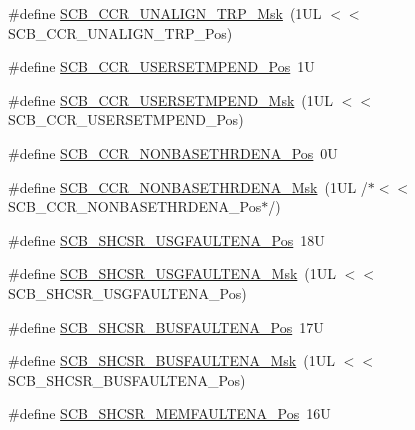 \begin{DoxyCompactItemize}
\item 
\#define \mbox{\hyperlink{group___c_m_s_i_s___s_c_b_ga68c96ad594af70c007923979085c99e0}{S\+C\+B\+\_\+\+C\+C\+R\+\_\+\+U\+N\+A\+L\+I\+G\+N\+\_\+\+T\+R\+P\+\_\+\+Msk}}~(1\+U\+L $<$$<$ S\+C\+B\+\_\+\+C\+C\+R\+\_\+\+U\+N\+A\+L\+I\+G\+N\+\_\+\+T\+R\+P\+\_\+\+Pos)
\item 
\#define \mbox{\hyperlink{group___c_m_s_i_s___s_c_b_ga789e41f45f59a8cd455fd59fa7652e5e}{S\+C\+B\+\_\+\+C\+C\+R\+\_\+\+U\+S\+E\+R\+S\+E\+T\+M\+P\+E\+N\+D\+\_\+\+Pos}}~1U
\item 
\#define \mbox{\hyperlink{group___c_m_s_i_s___s_c_b_ga4cf59b6343ca962c80e1885710da90aa}{S\+C\+B\+\_\+\+C\+C\+R\+\_\+\+U\+S\+E\+R\+S\+E\+T\+M\+P\+E\+N\+D\+\_\+\+Msk}}~(1\+U\+L $<$$<$ S\+C\+B\+\_\+\+C\+C\+R\+\_\+\+U\+S\+E\+R\+S\+E\+T\+M\+P\+E\+N\+D\+\_\+\+Pos)
\item 
\#define \mbox{\hyperlink{group___c_m_s_i_s___s_c_b_gab4615f7deb07386350365b10240a3c83}{S\+C\+B\+\_\+\+C\+C\+R\+\_\+\+N\+O\+N\+B\+A\+S\+E\+T\+H\+R\+D\+E\+N\+A\+\_\+\+Pos}}~0U
\item 
\#define \mbox{\hyperlink{group___c_m_s_i_s___s_c_b_gafe0f6be81b35d72d0736a0a1e3b4fbb3}{S\+C\+B\+\_\+\+C\+C\+R\+\_\+\+N\+O\+N\+B\+A\+S\+E\+T\+H\+R\+D\+E\+N\+A\+\_\+\+Msk}}~(1\+U\+L /$\ast$$<$$<$ S\+C\+B\+\_\+\+C\+C\+R\+\_\+\+N\+O\+N\+B\+A\+S\+E\+T\+H\+R\+D\+E\+N\+A\+\_\+\+Pos$\ast$/)
\item 
\#define \mbox{\hyperlink{group___c_m_s_i_s___s_c_b_gae71949507636fda388ec11d5c2d30b52}{S\+C\+B\+\_\+\+S\+H\+C\+S\+R\+\_\+\+U\+S\+G\+F\+A\+U\+L\+T\+E\+N\+A\+\_\+\+Pos}}~18U
\item 
\#define \mbox{\hyperlink{group___c_m_s_i_s___s_c_b_ga056fb6be590857bbc029bed48b21dd79}{S\+C\+B\+\_\+\+S\+H\+C\+S\+R\+\_\+\+U\+S\+G\+F\+A\+U\+L\+T\+E\+N\+A\+\_\+\+Msk}}~(1\+U\+L $<$$<$ S\+C\+B\+\_\+\+S\+H\+C\+S\+R\+\_\+\+U\+S\+G\+F\+A\+U\+L\+T\+E\+N\+A\+\_\+\+Pos)
\item 
\#define \mbox{\hyperlink{group___c_m_s_i_s___s_c_b_ga3d32edbe4a5c0335f808cfc19ec7e844}{S\+C\+B\+\_\+\+S\+H\+C\+S\+R\+\_\+\+B\+U\+S\+F\+A\+U\+L\+T\+E\+N\+A\+\_\+\+Pos}}~17U
\item 
\#define \mbox{\hyperlink{group___c_m_s_i_s___s_c_b_ga43e8cbe619c9980e0d1aacc85d9b9e47}{S\+C\+B\+\_\+\+S\+H\+C\+S\+R\+\_\+\+B\+U\+S\+F\+A\+U\+L\+T\+E\+N\+A\+\_\+\+Msk}}~(1\+U\+L $<$$<$ S\+C\+B\+\_\+\+S\+H\+C\+S\+R\+\_\+\+B\+U\+S\+F\+A\+U\+L\+T\+E\+N\+A\+\_\+\+Pos)
\item 
\#define \mbox{\hyperlink{group___c_m_s_i_s___s_c_b_ga685b4564a8760b4506f14ec4307b7251}{S\+C\+B\+\_\+\+S\+H\+C\+S\+R\+\_\+\+M\+E\+M\+F\+A\+U\+L\+T\+E\+N\+A\+\_\+\+Pos}}~16U

\end{DoxyCompactItemize}
